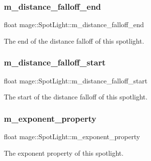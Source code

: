\subsubsection{\texorpdfstring{m\+\_\+distance\+\_\+falloff\+\_\+end}{m\_distance\_falloff\_end}}
{\footnotesize\ttfamily float mage\+::\+Spot\+Light\+::m\+\_\+distance\+\_\+falloff\+\_\+end\hspace{0.3cm}{\ttfamily [private]}}

The end of the distance falloff of this spotlight. \hypertarget{classmage_1_1_spot_light_a96c4a4f1b77c9a6aadb82cf48248cc5d}{}\label{classmage_1_1_spot_light_a96c4a4f1b77c9a6aadb82cf48248cc5d} 
\subsubsection{\texorpdfstring{m\+\_\+distance\+\_\+falloff\+\_\+start}{m\_distance\_falloff\_start}}
{\footnotesize\ttfamily float mage\+::\+Spot\+Light\+::m\+\_\+distance\+\_\+falloff\+\_\+start\hspace{0.3cm}{\ttfamily [private]}}

The start of the distance falloff of this spotlight. \hypertarget{classmage_1_1_spot_light_ac1ac3c8c25760d8beb7e05c8caeaa6a3}{}\label{classmage_1_1_spot_light_ac1ac3c8c25760d8beb7e05c8caeaa6a3} 
\subsubsection{\texorpdfstring{m\+\_\+exponent\+\_\+property}{m\_exponent\_property}}
{\footnotesize\ttfamily float mage\+::\+Spot\+Light\+::m\+\_\+exponent\+\_\+property\hspace{0.3cm}{\ttfamily [private]}}

The exponent property of this spotlight. 